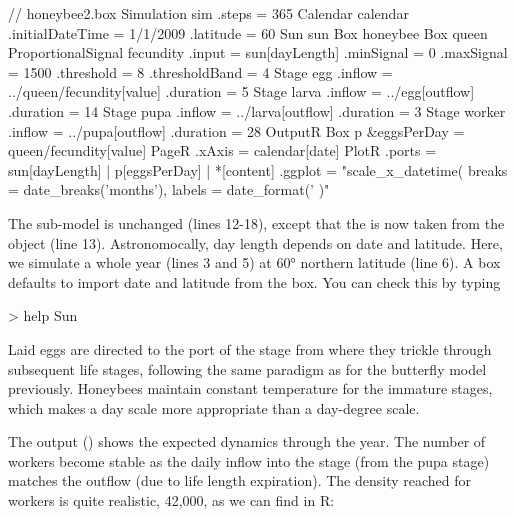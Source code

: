 \lstset{numbers=left}
\begin{boxscript}
// honeybee2.box
Simulation sim {
  .steps = 365
  Calendar calendar {
    .initialDateTime = 1/1/2009
    .latitude = 60
  }
  Sun sun {
  }
  Box honeybee {
    Box queen {
      ProportionalSignal fecundity {
        .input = sun[dayLength]
        .minSignal = 0
        .maxSignal = 1500
        .threshold = 8
        .thresholdBand = 4
      }
    }
    Stage egg {
      .inflow = ../queen/fecundity[value]
      .duration = 5
    }
    Stage larva {
      .inflow = ../egg[outflow]
      .duration = 14
    }
    Stage pupa {
      .inflow = ../larva[outflow]
      .duration = 3
    }
    Stage worker {
      .inflow = ../pupa[outflow]
      .duration = 28
    }
  }
  OutputR {
    Box p {
      &eggsPerDay = queen/fecundity[value]
    }
    PageR {
      .xAxis = calendar[date]
      PlotR {
        .ports = sun[dayLength] |
                   p[eggsPerDay] |
                   *[content] 
        .ggplot = "scale_x_datetime( 
                     breaks = date_breaks('months'), 
                     labels = date_format('%
                    )"
      }
    }
  }
}
\end{boxscript}
\lstset{numbers=none}

The  sub-model is  unchanged (lines 12-18), except that the  is now taken from the  object (line 13). Astronomocally, day length depends on date and latitude. Here, we simulate a whole year (lines 3 and 5) at \ang{60} northern latitude (line 6). A  box defaults to import date and latitude from the  box. You can check this by typing

\begin{rdialog}
> help Sun
\end{rdialog}

Laid eggs are directed to the  port of the  stage from where they trickle through subsequent life stages, following the same paradigm as for the butterfly model previously. Honeybees maintain constant temperature for the immature stages, which makes a day scale more appropriate than a day-degree scale.

The output () shows the expected dynamics through the year. The number of workers become stable as the daily inflow into the stage (from the pupa stage) matches the outflow (due to life length expiration). The density reached for workers is quite realistic, 42,000, as we can find in R:

